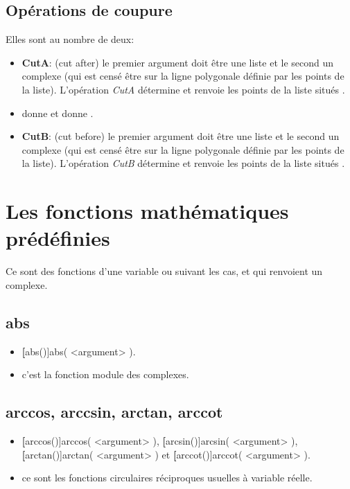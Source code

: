 \subsection{Opérations de coupure}

Elles sont au nombre de deux:

\begin{itemize}
 \item \textbf{CutA}: (cut after) le premier argument doit être une liste et le second un complexe (qui est censé être sur la ligne polygonale définie par les points de la liste). L'opération \textsl{CutA} détermine et renvoie les points de la liste situés .
 \item \exem {} donne \res{[1,2,3,3.5]} et  donne \Nil.
 \item \textbf{CutB}: (cut before) le premier argument doit être une liste et le second un complexe (qui est censé être sur la ligne polygonale définie par les points de la liste). L'opération \textsl{CutB} détermine et renvoie les points de la liste situés .

\end{itemize}


\section{Les fonctions mathématiques prédéfinies}

Ce sont des fonctions d'une variable  ou  suivant les cas, et qui renvoient un
complexe.


\subsection{abs}

\begin{itemize}
 \item \util \textbf[abs()]{abs( <argument> )}.
 \item \desc c'est la fonction module des complexes.
\end{itemize}

\subsection{arccos, arccsin, arctan, arccot}

\begin{itemize}
 \item \util \textbf[arccos()]{arccos( <argument> )}, \textbf[arcsin()]{arcsin( <argument> )}, \textbf[arctan()]{arctan( <argument> )} et \textbf[arccot()]{arccot( <argument> )}.
 \item \desc ce sont les fonctions circulaires réciproques usuelles à variable réelle.
\end{itemize}

